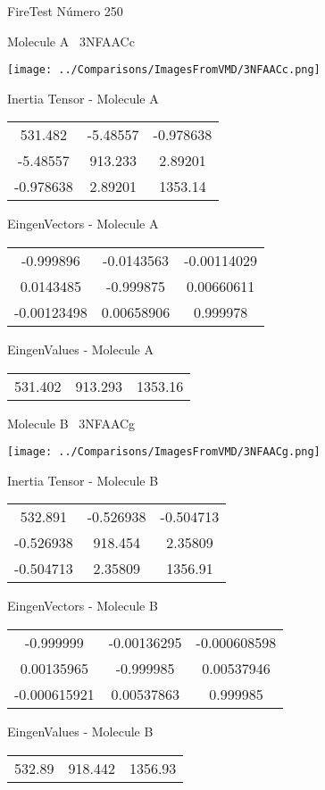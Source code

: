 \vtab[-3cm]
\begin{center}
{\large FireTest \tab Número 250}
\end{center}
\begin{multicols}{2}
\begin{center}

Molecule A \
3NFAACc

\texttt{[image: ../Comparisons/ImagesFromVMD/3NFAACc.png]}

Inertia Tensor - Molecule A \\
\begin{tabular}{|c c c|}
531.482	 & 	-5.48557	 & 	-0.978638	 \\
-5.48557	 & 	913.233	 & 	2.89201	 \\
-0.978638	 & 	2.89201	 & 	1353.14
\end{tabular}

\vtab
 EingenVectors - Molecule A     \\
\begin{tabular}{|c c c|}
-0.999896	 & 	-0.0143563	 & 	-0.00114029	 \\
0.0143485	 & 	-0.999875	 & 	0.00660611	 \\
-0.00123498	 & 	0.00658906	 & 	0.999978
\end{tabular}

\vtab
 EingenValues - Molecule A     \\
\begin{tabular}{|c c c|}
531.402	 & 	913.293	 & 	1353.16	 \\
\end{tabular}
\columnbreak

Molecule B \
3NFAACg

\texttt{[image: ../Comparisons/ImagesFromVMD/3NFAACg.png]}

Inertia Tensor - Molecule B \\
\begin{tabular}{|c c c|}
532.891	 & 	-0.526938	 & 	-0.504713	 \\
-0.526938	 & 	918.454	 & 	2.35809	 \\
-0.504713	 & 	2.35809	 & 	1356.91
\end{tabular}

\vtab
 EingenVectors - Molecule B     \\
\begin{tabular}{|c c c|}
-0.999999	 & 	-0.00136295	 & 	-0.000608598	 \\
0.00135965	 & 	-0.999985	 & 	0.00537946	 \\
-0.000615921	 & 	0.00537863	 & 	0.999985
\end{tabular}

\vtab
 EingenValues - Molecule B     \\
\begin{tabular}{|c c c|}
532.89	 & 	918.442	 & 	1356.93	 \\
\end{tabular}

\end{center}
\end{multicols}

